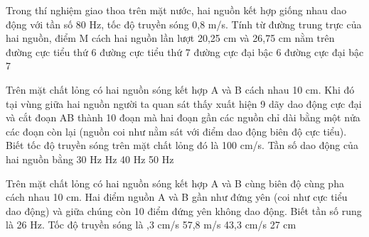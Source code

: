 \begin{ex}%
Trong thí nghiệm giao thoa trên mặt nước, hai nguồn kết hợp giống nhau dao động với tần số 80 Hz, tốc độ truyền sóng 0,8 m/s. Tính từ đường trung trực của hai nguồn, điểm M cách hai nguồn lần lượt 20,25 cm và 26,75 cm nằm trên
\choice
{đường cực tiểu thứ 6}
{\True đường cực tiểu thứ 7}
{đường cực đại bậc 6}
{đường cực đại bậc 7}
\end{ex} 
\begin{ex}%
Trên mặt chất lỏng có hai nguồn sóng kết hợp A và B cách nhau 10 cm. Khi đó tại vùng giữa hai nguồn người ta quan sát thấy xuất hiện 9 dãy dao động cực đại và cắt đoạn AB thành 10 đoạn mà hai đoạn gần các nguồn chỉ dài bằng một nửa các đoạn còn lại (nguồn coi như nằm sát với điểm dao động biên độ cực tiểu). Biết tốc độ truyền sóng trên mặt chất lỏng đó là 100 cm/s. Tần số dao động của hai nguồn bằng
\choice
{30 Hz}
{ Hz}
{40 Hz}
{50 Hz}
\end{ex} 
\begin{ex}%
Trên mặt chất lỏng có hai nguồn sóng kết hợp A và B cùng biên độ cùng pha cách nhau 10 cm. Hai điểm nguồn A và B gần như đứng yên (coi như cực tiểu dao động) và giữa chúng còn 10 điểm đứng yên không dao động. Biết tần số rung là 26 Hz. Tốc độ truyền sóng là
\choice
{,3 cm/s}
{57,8 m/s}
{43,3 cm/s}
{27 cm}
\end{ex} 



